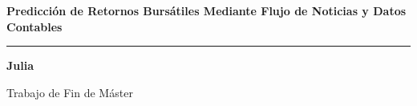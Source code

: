 \documentclass[aspectratio=169,11pt]{beamer}
\begin{document}
\begin{frame}[plain]
    \vspace{2.2cm}
    \begin{center}
        {\LARGE \color{UPCNavy} \textbf{Predicción de Retornos Bursátiles Mediante Flujo de Noticias y Datos Contables}} \par
        \vspace{0.8cm}
        \textcolor{UPCBlue}{\rule{0.4\paperwidth}{1.5pt}} \par
        \vspace{0.8cm}
        {\Large \textbf{Julia}} \par
        \vspace{0.3cm}
        {\color{gray}\normalsize Trabajo de Fin de Máster}
    \end{center}
\end{frame}
\end{document}
